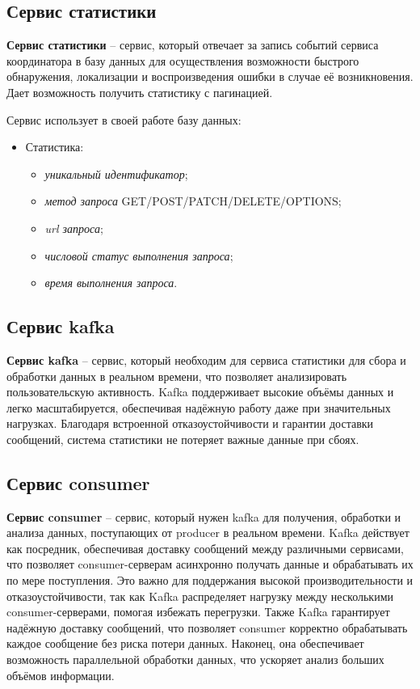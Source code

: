 \subsection{Сервис статистики}

\textbf{Сервис статистики} -- сервис, который отвечает за запись событий сервиса координатора в базу данных для осуществления возможности быстрого обнаружения, локализации и воспроизведения ошибки в случае её возникновения. Дает возможность получить статистику с пагинацией.

Сервис использует в своей работе базу данных:
\begin{itemize}
  \item Статистика:
  \begin{itemize}
    \item \textit{уникальный идентификатор};
    \item \textit{метод запроса} GET/POST/PATCH/DELETE/OPTIONS;
    \item \textit{url запроса};
    \item \textit{числовой статус выполнения запроса};
    \item \textit{время выполнения запроса}.
  \end{itemize}
\end{itemize}


\subsection{Сервис kafka}

\textbf{Сервис kafka} \cite{kafka} -- сервис, который необходим для сервиса статистики для сбора и обработки данных в реальном времени, что позволяет анализировать пользовательскую активность. Kafka поддерживает высокие объёмы данных и легко масштабируется, обеспечивая надёжную работу даже при значительных нагрузках. Благодаря встроенной отказоустойчивости и гарантии доставки сообщений, система статистики не потеряет важные данные при сбоях.


\subsection{Сервис consumer}

\textbf{Сервис consumer} -- сервис, который нужен kafka для получения, обработки и анализа данных, поступающих от producer в реальном времени. Kafka действует как посредник, обеспечивая доставку сообщений между различными сервисами, что позволяет consumer-серверам асинхронно получать данные и обрабатывать их по мере поступления. Это важно для поддержания высокой производительности и отказоустойчивости, так как Kafka распределяет нагрузку между несколькими consumer-серверами, помогая избежать перегрузки. Также Kafka гарантирует надёжную доставку сообщений, что позволяет consumer корректно обрабатывать каждое сообщение без риска потери данных. Наконец, она обеспечивает возможность параллельной обработки данных, что ускоряет анализ больших объёмов информации.


